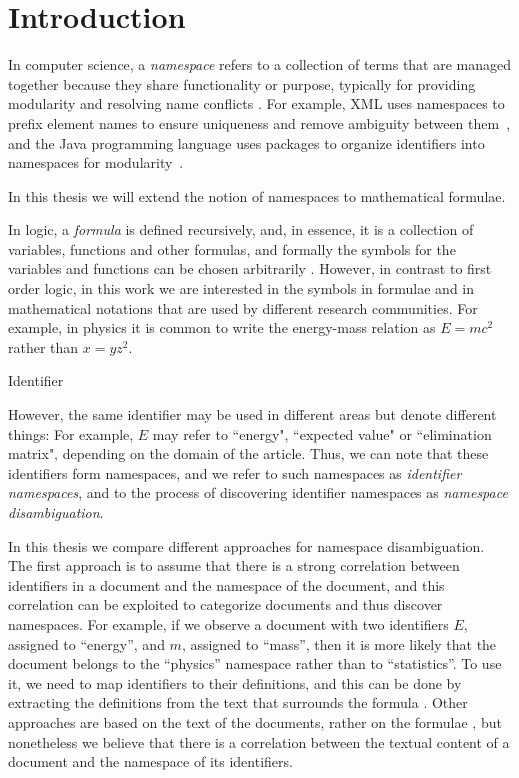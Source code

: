 \section{Introduction}

In computer science, a \emph{namespace} refers to a collection of terms that are managed 
together because they share functionality or purpose, typically for providing modularity 
and resolving name conflicts \cite{duval2002metadata}. For example, XML uses namespaces 
to prefix element names to ensure uniqueness and remove ambiguity between
them~\cite{bray1999namespaces}, and the Java programming language uses packages to organize
identifiers into namespaces for modularity~\cite{gosling2014java}.

In this thesis we will extend the notion of namespaces to mathematical formulae.


In logic, a \emph{formula} is defined recursively, and, in essence, 
it is a collection of variables, functions and other formulas, and formally the symbols for
the variables and functions can be chosen arbitrarily \cite{barwise2000language}. 
However, in contrast to first order logic, in this work we are interested in the symbols 
in formulae and in mathematical notations that are used by different research communities.
For example, in physics it is common to write the energy-mass relation as $E=mc^2$ rather 
than $x=yz^2$.

Identifier 


However, the same identifier may be used in different areas but denote different things: 
For example, $E$ may refer to ``energy", ``expected value" or ``elimination matrix", depending on
the domain of the article. Thus, we can note that these identifiers form namespaces, and we 
refer to such namespaces as \emph{identifier namespaces}, and to the process of discovering
identifier namespaces as \emph{namespace disambiguation}.


In this thesis we compare different approaches for namespace disambiguation. 
The first approach is to assume that there is a strong correlation between identifiers in 
a document and the namespace of the document, and this correlation can be exploited to 
categorize documents and thus discover namespaces. For example, if we observe a document with 
two identifiers $E$, assigned to ``energy'', and $m$, assigned to ``mass'', then it is more 
likely that the document belongs to the ``physics'' namespace rather than to ``statistics''. 
To use it, we need to map identifiers to their definitions, and this can be done by extracting 
the definitions from the text that surrounds the formula \cite{pagael2014mlp}. Other approaches 
are based on the text of the documents, rather on the formulae \cite{sebastiani2002machine}, 
but nonetheless we believe that there is a correlation between the textual content of a document 
and the namespace of its identifiers.






